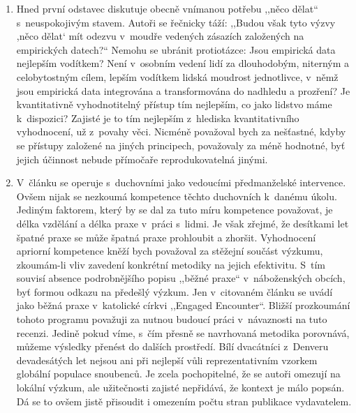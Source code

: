\begin{enumerate}
  \item{
    Hned první odstavec diskutuje obecně vnímanou potřebu ,,něco dělat``
    s~neuspokojivým stavem. Autoři se řečnicky táží: ,,Budou však tyto výzvy
    ,něco dělat` mít odezvu v~moudře vedených zásazích založených na empirických
    datech?{}`` Nemohu se ubránit protiotázce: Jsou empirická data nejlepším
    vodítkem? Není v~osobním vedení lidí za dlouhodobým, niterným a
    celobytostným cílem, lepším vodítkem lidská moudrost jednotlivce, v~němž
    jsou empirická data integrována a transformována do nadhledu a prozření? Je
    kvantitativně vyhodnotitelný přístup tím nejlepším, co jako lidstvo máme
    k~dispozici? Zajisté je to tím nejlepším z~hlediska kvantitativního
    vyhodnocení, už z~povahy věci. Nicméně považoval bych za nešťastné, kdyby se
    přístupy založené na jiných principech, považovaly za méně hodnotné, byť
    jejich účinnost nebude přímočaře reprodukovatelná jinými.
  }

  \item{
    V~článku se operuje s~duchovními jako vedoucími předmanželské intervence.
    Ovšem nijak se nezkoumá kompetence těchto duchovních k~danému úkolu. Jediným
    faktorem, který by se dal za tuto míru kompetence považovat, je délka
    vzdělání a délka praxe v~práci s~lidmi. Je však zřejmé, že desítkami let
    špatné praxe se může špatná praxe prohloubit a zhoršit. Vyhodnocení apriorní
    kompetence kněží bych považoval za stěžejní součást výzkumu, zkoumám-li vliv
    zavedení konkrétní metodiky na jejich efektivitu. S~tím souvisí absence
    podrobnějšího popisu ,,běžné praxe`` v~náboženských obcích, byť formou odkazu
    na předešlý výzkum. Jen v~citovaném článku\cite{renick1992prevention} se uvádí jako
    běžná praxe v~katolické církvi ,,Engaged Encounter``. Bližší prozkoumání
    tohoto programu považuji za nutnou budoucí práci v~návaznosti na tuto
    recenzi. Jedině pokud víme, s~čím přesně se navrhovaná metodika
    porovnává, můžeme výsledky přenést do dalších prostředí. Bílí dvacátníci
    z~Denveru devadesátých let nejsou ani při nejlepší vůli reprezentativním
    vzorkem globální populace snoubenců. Je zcela pochopitelné, že se autoři
    omezují na lokální výzkum, ale užitečnosti zajisté nepřidává, že kontext je
    málo popsán. Dá se to ovšem jistě přisoudit i omezením počtu stran publikace
    vydavatelem.
  }


\end{enumerate}
